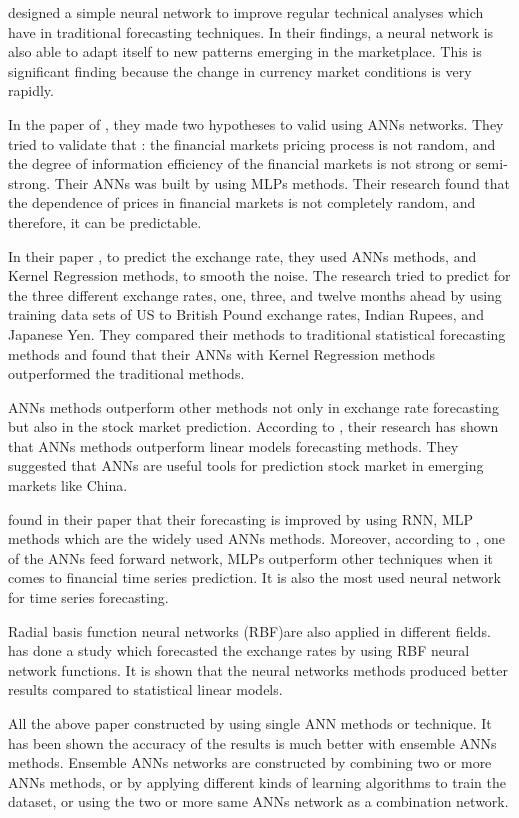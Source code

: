  designed a simple neural network to improve regular technical analyses which have in traditional forecasting techniques. In their findings, a neural network is also able to adapt itself to new patterns emerging in the marketplace. This is significant finding because the change in currency market conditions is very rapidly.

In the paper of , they made two hypotheses to valid using ANNs networks. They tried to validate that : the financial markets pricing process  is not random, and the degree of information efficiency of the financial markets is not strong or semi-strong. Their ANNs was built by using MLPs methods. Their research found that the dependence of prices in financial markets is not completely random, and therefore, it can be predictable.

In their paper , to predict the exchange rate, they used ANNs methods, and Kernel Regression methods, to smooth the noise. The research tried to predict for the three different exchange rates, one, three, and twelve months ahead by using training data sets of US to British Pound exchange rates, Indian Rupees, and Japanese Yen. They compared their methods to traditional statistical forecasting methods and found that their ANNs with Kernel Regression methods outperformed the traditional methods.

ANNs methods outperform other methods not only in exchange rate forecasting but also in the stock market prediction. According to , their research has shown that ANNs methods outperform linear models forecasting methods. They suggested that ANNs are useful tools for prediction stock market in emerging markets like China.

 found in their paper that their forecasting is improved by using RNN, MLP methods which are the widely used  ANNs methods. Moreover, according to , one of the ANNs feed forward network, MLPs outperform other techniques when it comes to financial time series prediction. It is also the most used neural network for time series forecasting. 

Radial basis function neural networks (RBF)are also applied in different fields.  has done a study which forecasted the exchange rates by using RBF neural network functions. It is shown that the neural networks methods produced better results compared to statistical linear models.

All the above paper  constructed by using single ANN methods or technique. It has been shown the accuracy of the results is much better with  ensemble ANNs methods. Ensemble ANNs networks are constructed by combining two or more ANNs methods, or by applying different kinds of learning algorithms to train the dataset, or using the two or more same  ANNs network as a combination network.

